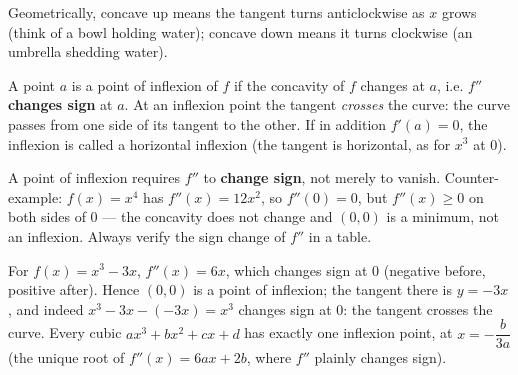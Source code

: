 \documentclass[11pt]{article}
\newcommand{\cle}[1]{{\popxbold\color{popdark}#1}}
\newcounter{popsec}
\newcounter{popsub}
\newcommand{\courssub}[1]{%
  \stepcounter{popsub}%
  \par\vspace{9pt}\noindent{\popxbold\fontsize{11.5}{13}\selectfont\color{popink}{\color{poporange}\thepopsec.\thepopsub}\hspace{6pt}#1}\par\nopagebreak\vspace{4pt}
}
\begin{document}
Geometrically, concave up means the tangent turns anticlockwise as $x$ grows (think of a bowl holding water); concave down means it turns clockwise (an umbrella shedding water).

\courssub{Points of Inflexion}

\begin{definition}
A point $a$ is a \cle{point of inflexion} of $f$ if the concavity of $f$ changes at $a$, i.e. $f''$ \textbf{changes sign} at $a$. At an inflexion point the tangent \emph{crosses} the curve: the curve passes from one side of its tangent to the other. If in addition $f'(a)=0$, the inflexion is called a \cle{horizontal inflexion} (the tangent is horizontal, as for $x^3$ at $0$).
\end{definition}

\begin{attention}[$f''(a)=0$ does not guarantee an inflexion point]
A point of inflexion requires $f''$ to \textbf{change sign}, not merely to vanish. Counter-example: $f(x)=x^4$ has $f''(x)=12x^2$, so $f''(0)=0$, but $f''(x)\geq0$ on both sides of $0$ — the concavity does not change and $(0,0)$ is a minimum, not an inflexion. Always verify the sign change of $f''$ in a table.
\end{attention}

\begin{exemplebox}
For $f(x)=x^3-3x$, $f''(x)=6x$, which changes sign at $0$ (negative before, positive after). Hence $(0,0)$ is a point of inflexion; the tangent there is $y=-3x$, and indeed $x^3-3x-(-3x)=x^3$ changes sign at $0$: the tangent crosses the curve. Every cubic $ax^3+bx^2+cx+d$ has exactly one inflexion point, at $x=-\dfrac{b}{3a}$ (the unique root of $f''(x)=6ax+2b$, where $f''$ plainly changes sign).
\end{exemplebox}
\end{document}
